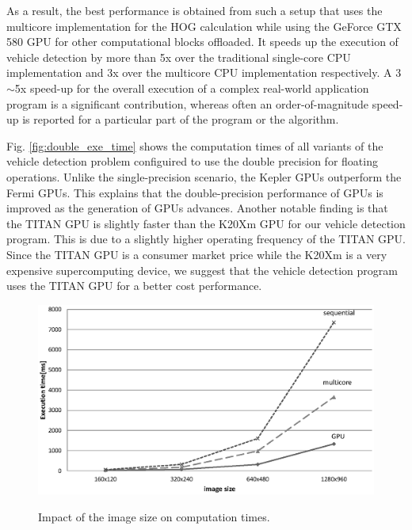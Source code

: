 As a result, the best performance is obtained from such a setup that
uses the multicore implementation for the HOG calculation while using
the GeForce GTX 580 GPU for other computational blocks offloaded.
It speeds up the execution of vehicle detection by more than 5x over the
traditional single-core CPU implementation and 3x over the multicore CPU
implementation respectively. 
A 3$\sim$5x speed-up for the overall execution of a complex real-world
application program is a significant contribution, whereas often an
order-of-magnitude speed-up is reported for a particular part of the
program or the algorithm.

Fig. \ref{fig:double_exe_time} shows the computation times of all variants
of the vehicle detection problem configuired to use the double precision
for floating operations.
Unlike the single-precision scenario, the Kepler GPUs outperform the
Fermi GPUs.
This explains that the double-precision performance of GPUs is improved
as the generation of GPUs advances.
Another notable finding is that the TITAN GPU is slightly faster than
the K20Xm GPU for our vehicle detection program.
This is due to a slightly higher operating frequency of the TITAN GPU.
Since the TITAN GPU is a consumer market price while the K20Xm is a very
expensive supercomputing device, we suggest that the vehicle detection
program uses the TITAN GPU for a better cost performance.

\begin{figure}[t]
 \begin{center}
  \includegraphics[width=\hsize]{fig/time_on_image_size.eps}\\
  \caption{Impact of the image size on computation times.}
  \label{fig:time_on_image_size}
 \end{center}
\end{figure}

